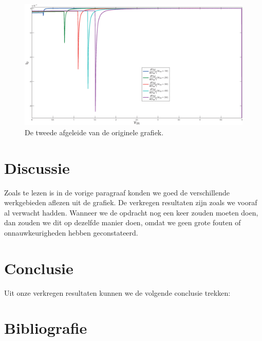 \documentclass{scrartcl}  %
\begin{document}
\begin{figure}[H]
\centering
		\includegraphics[width=\textwidth]{resources/Id_Vds_2nd_div}
		\caption{De tweede afgeleide van de originele grafiek.}
		\label{fig:Id-2nd-div}
\end{figure}


\section{Discussie}
Zoals te lezen is in de vorige paragraaf konden we goed de verschillende werkgebieden aflezen uit de grafiek. De verkregen resultaten zijn zoals we vooraf al verwacht hadden. Wanneer we de opdracht nog een keer zouden moeten doen, dan zouden we dit op dezelfde manier doen, omdat we geen grote fouten of onnauwkeurigheden hebben geconstateerd. 

\section{Conclusie}
Uit onze verkregen resultaten kunnen we de volgende conclusie trekken: 

\section{Bibliografie}
\printbibliography
\end{document}
